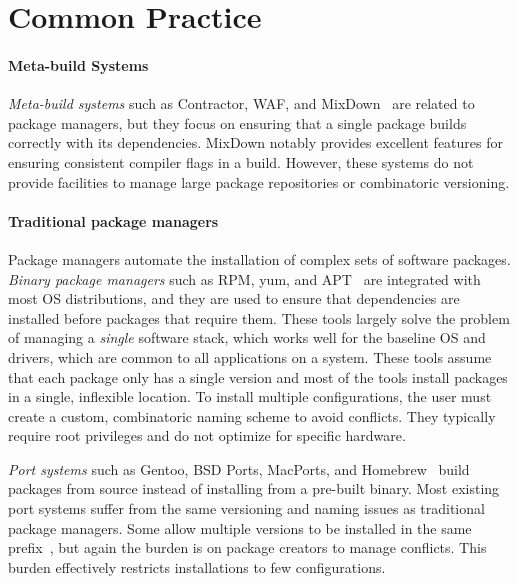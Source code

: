 
\section{Common Practice}
\label{sec:motivation}

\paragraph{Meta-build Systems}
{\it Meta-build systems} such as Contractor, WAF, and
MixDown~\cite{amundson:contractor,epperly+:mixdown,epperly+:mixdown-report,nagy:waf} are
related to package managers, but they focus on ensuring that a single
package builds correctly with its dependencies.  MixDown notably provides excellent
features for ensuring consistent compiler flags in a build.
However, these systems do not provide facilities to manage
large package repositories or combinatoric versioning.

\paragraph{Traditional package managers}
Package managers automate the installation of complex sets of software packages.
{\it Binary package managers} such as RPM, yum, and  
APT~\cite{foster+:rpm03,silva:apt01,yum} are integrated with most
OS distributions, and they are used to ensure that dependencies
are installed before packages that require them.
These tools largely solve the problem of managing a {\it single} software
stack, which works well for the baseline OS and drivers, which are 
common to all applications on a system.
These tools assume that each package only has a single version
and most of the tools install packages in a single, inflexible location.
To install multiple configurations, the user must create a custom, combinatoric
naming scheme to avoid conflicts. They typically require root 
privileges and do not optimize for specific hardware.

{\it Port systems} such as Gentoo, BSD Ports, MacPorts, and 
Homebrew~\cite{bsdports,groffen:gentoo-prefix,homebrew,macports,thiruvathukal:gentoo04}
build packages from source instead of installing from a pre-built binary.
Most existing port systems suffer from 
the same versioning and naming issues as traditional package managers.
Some allow multiple versions to be installed in the same
prefix~\cite{groffen:gentoo-prefix}, but again the burden is on package
creators to manage conflicts. This burden effectively restricts installations 
to few configurations.


